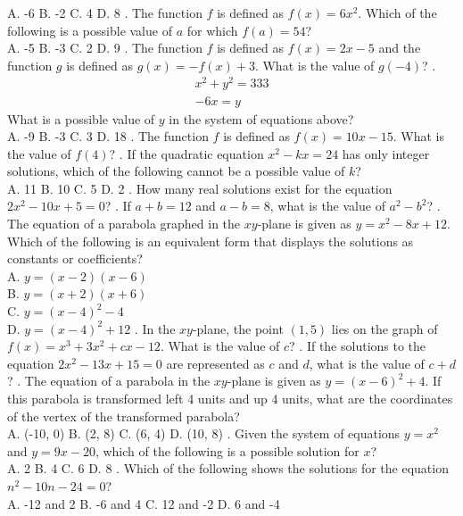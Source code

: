 \documentclass[../satmath.tex]{subfiles}
\begin{document}
A. -6 \quad B. -2 \quad C. 4 \quad D. 8
. The function $f$ is defined as $f(x)=6x^2$. Which of the following is a possible value of $a$ for which $f(a)=54$?\\
A. -5 \quad B. -3 \quad C. 2 \quad D. 9
. The function $f$ is defined as $f(x)=2x-5$ and the function $g$ is defined as $g(x)=-f(x)+3$. What is the value of $g(-4)$?
. 
\begin{align*}
x^2+y^2=333\\
-6x=y
\end{align*}
What is a possible value of $y$ in the system of equations above?\\
A. -9 \quad B. -3 \quad C. 3 \quad D. 18
. The function $f$ is defined as $f(x)=10x-15$. What is the value of $f(4)$?
. If the quadratic equation $x^2-kx = 24$ has only integer solutions, which of the following cannot be a possible value of $k$?\\
A. 11 \quad B. 10 \quad C. 5 \quad D. 2
. How many real solutions exist for the equation $2x^2-10x+5=0$?
. If $a+b=12$ and $a-b=8$, what is the value of $a^2-b^2$?
. The equation of a parabola graphed in the $xy$-plane is given as $y=x^2-8x+12$. Which of the following is an equivalent form that displays the 
solutions as constants or coefficients?\\
A. $y=(x-2)(x-6)$\\
B. $y=(x+2)(x+6)$\\
C. $y=(x-4)^2-4$\\
D. $y=(x-4)^2+12$
. In the $xy$-plane, the point $(1,5)$ lies on the graph of $f(x)=x^3+3x^2+cx-12$. What is the value of $c$?
. If the solutions to the equation $2x^2-13x+15=0$ are represented as $c$ and $d$, what is the value of $c+d$?
. The equation of a parabola in the $xy$-plane is given as $y=(x-6)^2+4$. If this parabola is transformed left 4 units and up 4 units, what are the coordinates of the vertex of the transformed parabola?\\
A. (-10, 0) \quad B. (2, 8) \quad C. (6, 4) \quad D. (10, 8)
. Given the system of equations $y=x^2$ and $y=9x-20$, which of the following is a possible solution for $x$?\\
A. 2 \quad B. 4 \quad C. 6 \quad D. 8
. Which of the following shows the solutions for the equation $n^2-10n-24=0$?\\
A. -12 and 2 \quad B. -6 and 4 \quad C. 12 and -2 \quad D. 6 and -4
\medbreak 
\end{document}

